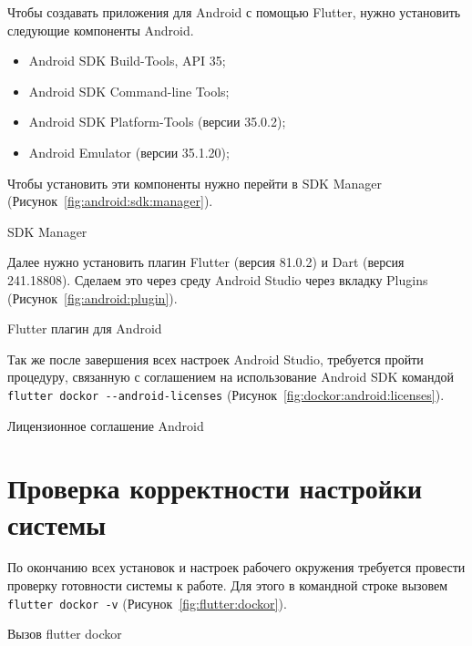 Чтобы создавать приложения для Android с помощью Flutter,
нужно установить следующие компоненты Android.

\begin{itemize}
	\item Android SDK Build-Tools, API 35;
	\item Android SDK Command-line Tools;
	\item Android SDK Platform-Tools (версии 35.0.2);
	\item Android Emulator (версии 35.1.20);
\end{itemize}

Чтобы установить эти компоненты нужно перейти в SDK Manager
(Рисунок~\ref{fig:android:sdk:manager}). 

\begin{image}
	\caption{SDK Manager}
	\label{fig:android:sdk:manager}
\end{image}

Далее нужно установить плагин Flutter (версия 81.0.2)
и Dart (версия 241.18808).
Сделаем это через среду Android Studio через вкладку Plugins
(Рисунок~\ref{fig:android:plugin}).

\begin{image}
	\caption{Flutter плагин для Android}
	\label{fig:android:plugin}
\end{image}

Так же после завершения всех настроек Android Studio,
требуется пройти процедуру, связанную с соглашением на использование
Android SDK командой \verb|flutter dockor --android-licenses|
(Рисунок~\ref{fig:dockor:android:licenses}).

\begin{image}
	\caption{Лицензионное соглашение Android}
	\label{fig:dockor:android:licenses}
\end{image}

\section{Проверка корректности настройки системы}

По окончанию всех установок и настроек рабочего окружения требуется
провести проверку готовности системы к работе.
Для этого в командной строке вызовем \texttt{flutter dockor -v}
(Рисунок~\ref{fig:flutter:dockor}).

\begin{image}
	\caption{Вызов flutter dockor}
	\label{fig:flutter:dockor}
\end{image}

